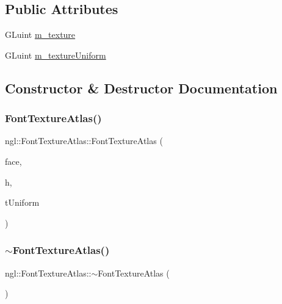 \subsection*{Public Attributes}
\begin{DoxyCompactItemize}
\item 
G\+Luint \mbox{\hyperlink{classngl_1_1_font_texture_atlas_a43e6121a1bb6a46a02c7b32ccedf51e0}{m\+\_\+texture}}
\item 
G\+Luint \mbox{\hyperlink{classngl_1_1_font_texture_atlas_ac402f468dfb1a71c4819fcb1a51b415e}{m\+\_\+texture\+Uniform}}
\end{DoxyCompactItemize}


\subsection{Constructor \& Destructor Documentation}
\mbox{\label{classngl_1_1_font_texture_atlas_a4021a39dbb1ed9c2c7363d58ef1f1100}} 
\subsubsection{\texorpdfstring{Font\+Texture\+Atlas()}{FontTextureAtlas()}}
{\footnotesize\ttfamily ngl\+::\+Font\+Texture\+Atlas\+::\+Font\+Texture\+Atlas (\begin{DoxyParamCaption}\item[{F\+T\+\_\+\+Face}]{face,  }\item[{int}]{h,  }\item[{G\+Luint}]{t\+Uniform }\end{DoxyParamCaption})}

\mbox{\label{classngl_1_1_font_texture_atlas_a11bdab6a6379dc3ffc3c1c70d7d60f6a}} 
\subsubsection{\texorpdfstring{$\sim$\+Font\+Texture\+Atlas()}{~FontTextureAtlas()}}
{\footnotesize\ttfamily ngl\+::\+Font\+Texture\+Atlas\+::$\sim$\+Font\+Texture\+Atlas (\begin{DoxyParamCaption}{ }\end{DoxyParamCaption})}



